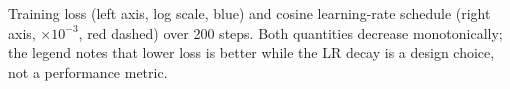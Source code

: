 \caption{Training loss (left axis, log scale, blue) and cosine learning-rate schedule (right axis, $\times10^{-3}$, red dashed) over 200 steps. Both quantities decrease monotonically; the legend notes that lower loss is better while the LR decay is a design choice, not a performance metric.}
